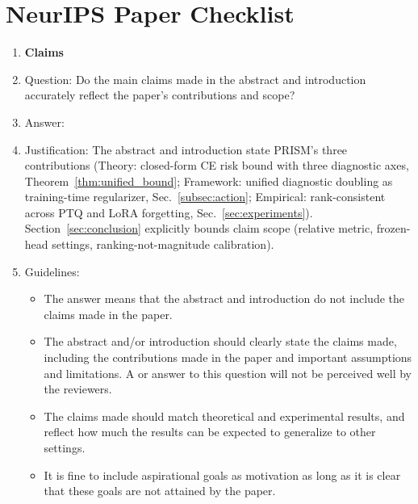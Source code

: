 \section*{NeurIPS Paper Checklist}

\begin{enumerate}

\item {\bf Claims}
    \item[] Question: Do the main claims made in the abstract and introduction accurately reflect the paper's contributions and scope?
    \item[] Answer: \answerYes{}
    \item[] Justification: The abstract and introduction state PRISM's three contributions (Theory: closed-form CE risk bound with three diagnostic axes, Theorem~\ref{thm:unified_bound}; Framework: unified diagnostic doubling as training-time regularizer, Sec.~\ref{subsec:action}; Empirical: rank-consistent across PTQ and LoRA forgetting, Sec.~\ref{sec:experiments}). Section~\ref{sec:conclusion} explicitly bounds claim scope (relative metric, frozen-head settings, ranking-not-magnitude calibration).
    \item[] Guidelines:
    \begin{itemize}
        \item The answer \answerNA{} means that the abstract and introduction do not include the claims made in the paper.
        \item The abstract and/or introduction should clearly state the claims made, including the contributions made in the paper and important assumptions and limitations. A \answerNo{} or \answerNA{} answer to this question will not be perceived well by the reviewers.
        \item The claims made should match theoretical and experimental results, and reflect how much the results can be expected to generalize to other settings.
        \item It is fine to include aspirational goals as motivation as long as it is clear that these goals are not attained by the paper.
    \end{itemize}


\end{enumerate}
